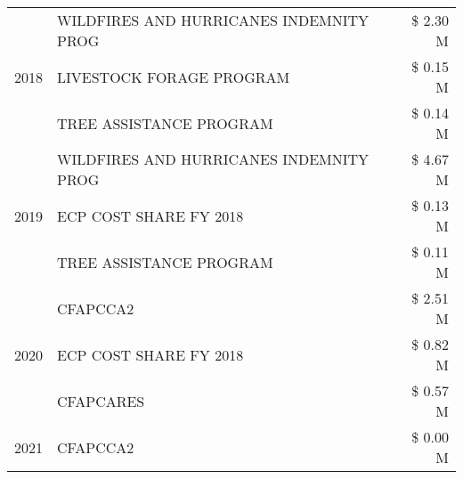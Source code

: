 \begin{tabular}{llr}
\cline{1-3}
\multirow[t]{3}{*}{2018} & WILDFIRES AND HURRICANES INDEMNITY PROG & \$ 2.30 M \\
 & LIVESTOCK FORAGE PROGRAM & \$ 0.15 M \\
 & TREE ASSISTANCE PROGRAM & \$ 0.14 M \\
\cline{1-3}
\multirow[t]{3}{*}{2019} & WILDFIRES AND HURRICANES INDEMNITY PROG & \$ 4.67 M \\
 & ECP COST SHARE FY 2018 & \$ 0.13 M \\
 & TREE ASSISTANCE PROGRAM & \$ 0.11 M \\
\cline{1-3}
\multirow[t]{3}{*}{2020} & CFAPCCA2 & \$ 2.51 M \\
 & ECP COST SHARE FY 2018 & \$ 0.82 M \\
 & CFAPCARES & \$ 0.57 M \\
\cline{1-3}
2021 & CFAPCCA2 & \$ 0.00 M \\
\cline{1-3}
\bottomrule
\end{tabular}
